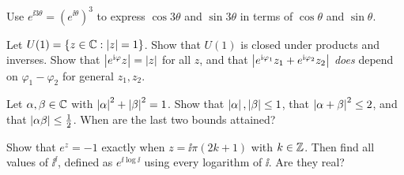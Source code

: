 \begin{exerciseset}
   Use $e^{\ii3\theta}=(e^{\ii\theta})^3$ to express $\cos3\theta$ and $\sin3\theta$ in terms of $\cos\theta$ and $\sin\theta$.

   Let $U(1)=\{z\in\mathbb{C}:\left|z\right|=1\}$. Show that $U(1)$ is closed under products and inverses. Show that $\left|e^{\mathrm{i}\varphi}z\right|=\left|z\right|$ for all $z$, and that $\left|e^{\mathrm{i}\varphi_1}z_1+e^{\mathrm{i}\varphi_2}z_2\right|$ \emph{does} depend on $\varphi_1-\varphi_2$ for general $z_1,z_2$.

   Let $\alpha,\beta\in\mathbb{C}$ with $\left|\alpha\right|^2+\left|\beta\right|^2=1$. Show that $\left|\alpha\right|,\left|\beta\right|\le1$, that $\left|\alpha+\beta\right|^2\le2$, and that $\left|\alpha\beta\right|\le\tfrac12$. When are the last two bounds attained?

   Show that $e^z=-1$ exactly when $z=\ii\pi(2k+1)$ with $k\in\mathbb{Z}$. Then find all values of $\ii^{\ii}$, defined as $e^{\ii\log\ii}$ using every logarithm of $\ii$. Are they real?
\end{exerciseset}
